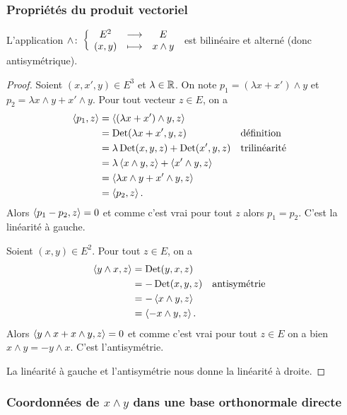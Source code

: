    \subsubsection{Propriétés du produit vectoriel}

    \begin{theo}
      L'application \(\wedge\colon \left\{\begin{array}{ccc} E^2 & \longrightarrow &E\\ (x,y) & \longmapsto & x \wedge y \end{array} \right.\) est bilinéaire et alterné (donc antisymétrique).
    \end{theo}
    \begin{proof}
      Soient \((x,x',y) \in E^3\) et \(\lambda \in \mathbb{R}\). On note \(p_1=(\lambda x+x')\wedge y\) et \(p_2=\lambda x\wedge y+x'\wedge y\). Pour tout vecteur \(z \in E\), on a
      \begin{align}
        \left\langle{p_1},{z}\right\rangle &=\left\langle{(\lambda x+x')\wedge y},{z}\right\rangle \\
                          &=\operatorname{Det}(\lambda x +x',y,z) && \text{définition}\\
                          &=\lambda \operatorname{Det}(x,y,z) +\operatorname{Det}(x',y,z) && \text{trilinéarité}\\
                          &=\lambda \left\langle{x \wedge y},{z}\right\rangle + \left\langle{x' \wedge y},{z}\right\rangle \\
                          &=\left\langle{\lambda x\wedge y +x'\wedge y},{z}\right\rangle\\
                          &=\left\langle{p_2},{z}\right\rangle.
      \end{align}
      Alors \(\left\langle{p_1-p_2},{z}\right\rangle=0\) et comme c'est vrai pour tout \(z\) alors \(p_1=p_2\). C'est la linéarité à gauche.

      Soient \((x,y) \in E^2\). Pour tout \(z \in E\), on a
      \begin{align}
        \left\langle{y \wedge x},{z}\right\rangle &= \operatorname{Det}(y,x,z) \\
                                 &=-\operatorname{Det}(x,y,z) && \text{antisymétrie} \\
                                 &=-\left\langle{x \wedge y},{z}\right\rangle\\
                                 &=\left\langle{-x \wedge y},{z}\right\rangle.
      \end{align}
      Alors \(\left\langle{y \wedge x+x \wedge y},{z}\right\rangle=0\) et comme c'est vrai pour tout \(z \in E\) on a bien \(x \wedge y = -y\wedge x\). C'est l'antisymétrie.

      La linéarité à gauche et l'antisymétrie nous donne la linéarité à droite.
    \end{proof}

    \subsubsection{Coordonnées de \(x \wedge y\) dans une base orthonormale directe}

